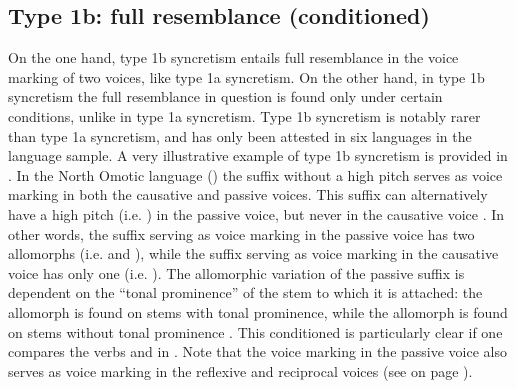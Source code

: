 \newpage
\subsection{Type 1b: full resemblance (conditioned)} \label{resemblance-type1b}
On the one hand, type 1b syncretism entails full resemblance in the voice marking of two voices, like type 1a syncretism. On the other hand, in type 1b syncretism the full resemblance in question is found only under certain conditions, unlike in type 1a syncretism. Type 1b syncretism is notably rarer than type 1a syncretism, and has only been attested in six languages in the language sample. A very illustrative example of type 1b syncretism is provided in . In the North Omotic language  () the suffix  without a high pitch serves as voice marking in both the causative and passive voices. This suffix can alternatively have a high pitch (i.e. ) in the passive voice, but never in the causative voice \citep[1008]{wakasa:2008}. In other words, the suffix serving as voice marking in the passive voice has two allomorphs (i.e.  and ), while the suffix serving as voice marking in the causative voice has only one (i.e. ). The allomorphic variation of the passive suffix is dependent on the “tonal prominence” of the stem to which it is attached: the allomorph  is found on stems with tonal prominence, while the allomorph  is found on stems without tonal prominence \citep[84ff., 1013]{wakasa:2008}. This conditioned  is particularly clear if one compares the verbs  and  in . Note that the voice marking in the passive voice also serves as voice marking in the reflexive and reciprocal voices (see  on page \pageref{tab:ch5:caus-pass-antc}).

